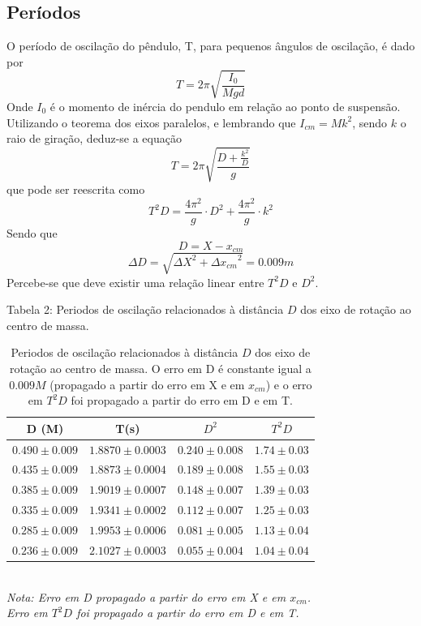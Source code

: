 \documentclass[12pt,a4paper]{article}
\begin{document}
\subsection{Períodos}
O período de oscilação do pêndulo, T, para pequenos ângulos de oscilação, é dado por
$$ T = 2 \pi \sqrt{\frac{I_0}{Mgd}} $$
Onde $I_0$ é o momento de inércia do pendulo em relação ao ponto de suspensão.
Utilizando o teorema dos eixos paralelos, e lembrando que $I_{cm} = Mk^2$, sendo 
$k$ o raio de giração, deduz-se a equação
$$ T = 2\pi\sqrt{\frac{D + \frac{k^2}{D}}{g}} $$ 
que pode ser reescrita como 
\begin{equation} \label{eq:funcao}
 T^2D = \frac{4\pi^2}{g} \cdot D^2 + \frac{4\pi^2}{g} \cdot k^2 
\end{equation}
Sendo que $$D = X - x_{cm} $$ 
$$ \Delta D = \sqrt{{\Delta X}^2 + {\Delta x_{cm}}^2}  = 0.009 m$$
Percebe-se que deve existir uma relação linear entre $T^2D$ e $D^2$.



  
\begin{table}[!htbp]
\caption{Periodos de oscilação relacionados à distância $D$ dos eixo de rotação ao centro de massa. O erro em D é constante igual a $0.009 M$ (propagado a partir do erro em X e em $x_{cm}$) e o erro em $T^2D$ foi propagado a partir do erro em D e em T.}
\def\arraystretch{1.5}

{Tabela 2: Periodos de oscilação relacionados à distância $D$ dos eixo de rotação ao centro de massa.}\\[10pt]

\begin{tabular}{|c|c|c|c|}
\hline
D (M)& T(s) & $D^2$ & $T^2D$ \\
\hline
$0.490\pm0.009$ & $1.8870 \pm 0.0003$ & $0.240\pm0.008$ & $1.74 \pm 0.03$\\
\hline
$0.435\pm0.009$ & $1.8873 \pm 0.0004$ & $0.189\pm0.008$ & $1.55 \pm 0.03$\\
\hline
$0.385\pm0.009$ & $1.9019 \pm 0.0007$ & $0.148\pm0.007$ & $1.39 \pm 0.03$\\
\hline
$0.335\pm0.009$ & $1.9341 \pm 0.0002$ & $0.112\pm0.007$ & $1.25 \pm 0.03$\\
\hline
$0.285\pm0.009$ & $1.9953 \pm 0.0006$ & $0.081\pm0.005$ & $1.13 \pm 0.04$\\
\hline
$0.236\pm0.009$ & $2.1027 \pm 0.0003$ & $0.055\pm0.004$ & $1.04 \pm 0.04$\\
\hline
\end{tabular}
\\
\emph {Nota: Erro em D propagado a partir do erro em X e em $x_{cm}$.\\
			Erro em $T^2D$ foi propagado a partir do erro em D e em T.\\}
\end{table}
\end{document}
